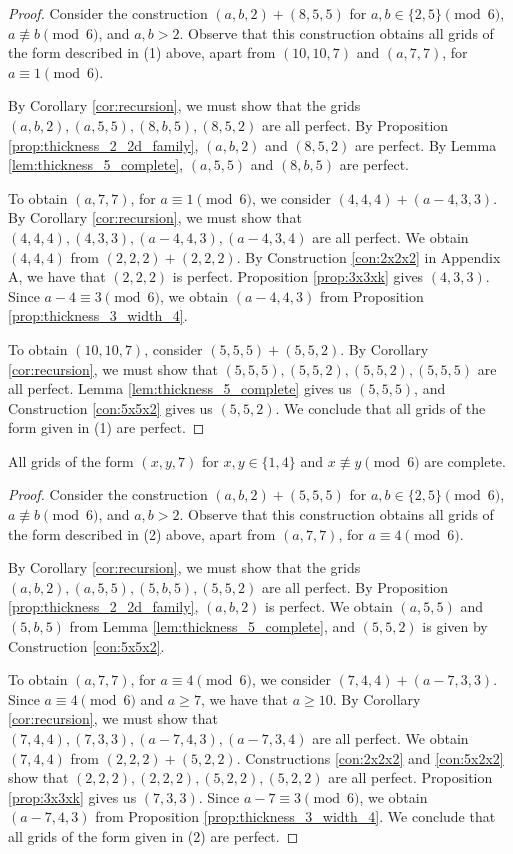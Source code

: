 \begin{proof}
Consider the construction $(a,b,2) + (8,5,5)$ for $a,b \in \{2,5\} \pmod 6$, $a \not\equiv b \pmod 6$, and $a,b > 2$. Observe that this construction obtains all grids of the form described in (1) above, apart from $(10,10,7)$ and $(a, 7,7)$, for $a \equiv 1 \pmod 6$. 

By Corollary \ref{cor:recursion}, we must show that the grids $(a,b,2), (a,5,5), (8,b,5), (8,5,2)$ are all perfect. By Proposition \ref{prop:thickness_2_2d_family}, $(a,b,2)$ and $(8,5,2)$ are perfect. By Lemma \ref{lem:thickness_5_complete}, $(a,5,5)$ and $(8,b,5)$ are perfect. 

To obtain $(a,7,7)$, for $a \equiv 1 \pmod 6$, we consider $(4,4,4) + (a-4,3,3)$. By Corollary \ref{cor:recursion}, we must show that $(4,4,4), (4,3,3), (a-4,4,3), (a-4,3,4)$ are all perfect. We obtain $(4,4,4)$ from $(2,2,2)+(2,2,2)$. By Construction \ref{con:2x2x2} in Appendix A, we have that $(2,2,2)$ is perfect. Proposition \ref{prop:3x3xk} gives $(4,3,3)$. Since $a-4 \equiv 3 \pmod 6$, we obtain $(a-4,4,3)$ from Proposition \ref{prop:thickness_3_width_4}.

To obtain $(10,10,7)$, consider $(5,5,5) + (5,5,2)$. By Corollary \ref{cor:recursion}, we must show that $(5,5,5), (5,5,2), (5,5,2), (5,5,5)$ are all perfect. Lemma \ref{lem:thickness_5_complete} gives us $(5,5,5)$, and Construction \ref{con:5x5x2} gives us $(5,5,2)$. We conclude that all grids of the form given in (1) are perfect. 
\end{proof}

\begin{lem}
\label{lem:thickness_7_case_2}
All grids of the form $(x,y,7)$ for $x,y \in \{1,4\}$ and $x \not\equiv y \pmod 6$ are complete.
\end{lem}

\begin{proof}
Consider the construction $(a,b,2) + (5,5,5)$ for $a,b \in \{2,5\} \pmod 6$, $a \not\equiv b \pmod 6$, and $a,b > 2$. Observe that this construction obtains all grids of the form described in (2) above, apart from $(a,7,7)$, for $a \equiv 4 \pmod 6$. 

By Corollary \ref{cor:recursion}, we must show that the grids $(a,b,2), (a,5,5), (5,b,5), (5,5,2)$ are all perfect. By Proposition \ref{prop:thickness_2_2d_family}, $(a,b,2)$ is perfect. We obtain $(a,5,5)$ and $(5,b,5)$ from Lemma \ref{lem:thickness_5_complete}, and $(5,5,2)$ is given by Construction \ref{con:5x5x2}.

To obtain $(a,7,7)$, for $a \equiv 4 \pmod 6$, we consider $(7,4,4) + (a-7,3,3)$. Since $a \equiv 4 \pmod 6$ and $a \geq 7$, we have that $a \geq 10$. By Corollary \ref{cor:recursion}, we must show that $(7,4,4), (7,3,3), (a-7,4,3), (a-7,3,4)$ are all perfect. We obtain $(7,4,4)$ from $(2,2,2) + (5,2,2)$. Constructions \ref{con:2x2x2} and \ref{con:5x2x2} show that $(2,2,2), (2,2,2), (5,2,2), (5,2,2)$ are all perfect. Proposition \ref{prop:3x3xk} gives us $(7,3,3)$. Since $a-7 \equiv 3 \pmod 6$, we obtain $(a-7,4,3)$ from Proposition \ref{prop:thickness_3_width_4}. We conclude that all grids of the form given in (2) are perfect. 
\end{proof}


